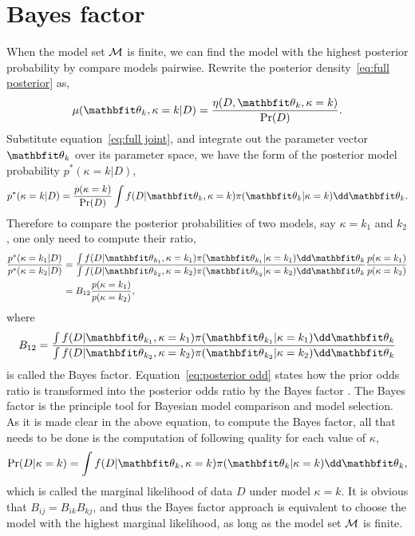 \section{Bayes factor}
\label{sec:Bayes factor}

When the model set $\mathcal{M}$ is finite, we can find the model with the highest
posterior probability by compare models pairwise. Rewrite the posterior
density~\eqref{eq:full posterior} as,
\begin{equation}
  \mu(\bth_k,\kappa=k|D) = \frac{\eta(D,\bth_k,\kappa=k)}{\Pr(D)}.
\end{equation}
Substitute equation~\eqref{eq:full joint}, and integrate out the parameter
vector $\bth_k$ over its parameter space, we have the form of the posterior
model probability $p^*(\kappa=k|D)$,
\begin{equation}
  p^*(\kappa=k|D) = \frac{p(\kappa = k)}{\Pr(D)}
  \int f(D|\bth_k,\kappa = k)\pi(\bth_k|\kappa = k)\dd\bth_k.
\end{equation}
Therefore to compare the posterior probabilities of two models, say $\kappa =
k_1$ and $k_2$, one only need to compute their ratio,
\begin{align}
  \frac{p^*(\kappa = k_1|D)}{p^*(\kappa = k_2|D)} &= \frac
  {\int f(D|\bth_{k_1},\kappa=k_1)\pi(\bth_{k_1}|\kappa=k_1)\dd\bth_k}
  {\int f(D|\bth_{k_2},\kappa=k_2)\pi(\bth_{k_2}|\kappa=k_2)\dd\bth_k}
  \frac{p(\kappa=k_1)}{p(\kappa=k_2)} \notag\\
  & = B_{12} \frac{p(\kappa=k_1)}{p(\kappa=k_2)},
  \label{eq:posterior odd}
\end{align}
where
\begin{equation}
  B_{12} = \frac
  {\int f(D|\bth_{k_1},\kappa=k_1)\pi(\bth_{k_1}|\kappa=k_1)\dd\bth_k}
  {\int f(D|\bth_{k_2},\kappa=k_2)\pi(\bth_{k_2}|\kappa=k_2)\dd\bth_k}
  \label{eq:bayes factor}
\end{equation}
is called the Bayes factor. Equation~\eqref{eq:posterior odd} states how the
prior odds ratio is transformed into the posterior odds ratio by the Bayes
factor \parencite{Kass:1995vb}. The Bayes factor is the principle tool for
Bayesian model comparison and model selection. As it is made clear in the
above equation, to compute the Bayes factor, all that needs to be done is the
computation of following quality for each value of $\kappa$,
\begin{equation}
  \Pr(D|\kappa = k)
  = \int f(D|\bth_k,\kappa=k)\pi(\bth_k|\kappa=k)\dd\bth_k,
  \label{eq:marginal likelihood}
\end{equation}
which is called the marginal likelihood of data $D$ under model $\kappa = k$.
It is obvious that $B_{ij} = B_{ik} B_{kj}$, and thus the Bayes factor
approach is equivalent to choose the model with the highest marginal
likelihood, as long as the model set $\mathcal{M}$ is finite.

